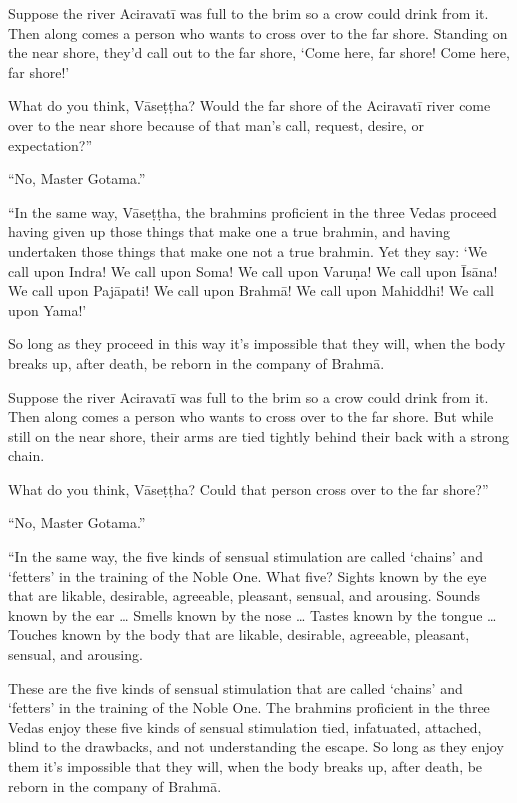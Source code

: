 \documentclass[12pt,openany]{book}%
\begin{document}
Suppose the river \textsanskrit{Aciravatī} was full to the brim so a crow could drink from it. Then along comes a person who wants to cross over to the far shore. Standing on the near shore, they’d call out to the far shore, ‘Come here, far shore! Come here, far shore!’ 

What do you think, \textsanskrit{Vāseṭṭha}? Would the far shore of the \textsanskrit{Aciravatī} river come over to the near shore because of that man’s call, request, desire, or expectation?” 

“No, Master Gotama.” 

“In the same way, \textsanskrit{Vāseṭṭha}, the brahmins proficient in the three Vedas proceed having given up those things that make one a true brahmin, and having undertaken those things that make one not a true brahmin. Yet they say: ‘We call upon Indra! We call upon Soma! We call upon \textsanskrit{Varuṇa}! We call upon \textsanskrit{Īsāna}! We call upon \textsanskrit{Pajāpati}! We call upon \textsanskrit{Brahmā}! We call upon Mahiddhi! We call upon Yama!’ 

So long as they proceed in this way it’s impossible that they will, when the body breaks up, after death, be reborn in the company of \textsanskrit{Brahmā}. 

Suppose the river \textsanskrit{Aciravatī} was full to the brim so a crow could drink from it. Then along comes a person who wants to cross over to the far shore. But while still on the near shore, their arms are tied tightly behind their back with a strong chain. 

What do you think, \textsanskrit{Vāseṭṭha}? Could that person cross over to the far shore?” 

“No, Master Gotama.” 

“In the same way, the five kinds of sensual stimulation are called ‘chains’ and ‘fetters’ in the training of the Noble One. What five? Sights known by the eye that are likable, desirable, agreeable, pleasant, sensual, and arousing. Sounds known by the ear … Smells known by the nose … Tastes known by the tongue … Touches known by the body that are likable, desirable, agreeable, pleasant, sensual, and arousing. 

These are the five kinds of sensual stimulation that are called ‘chains’ and ‘fetters’ in the training of the Noble One. The brahmins proficient in the three Vedas enjoy these five kinds of sensual stimulation tied, infatuated, attached, blind to the drawbacks, and not understanding the escape. So long as they enjoy them it’s impossible that they will, when the body breaks up, after death, be reborn in the company of \textsanskrit{Brahmā}. 
\end{document}
